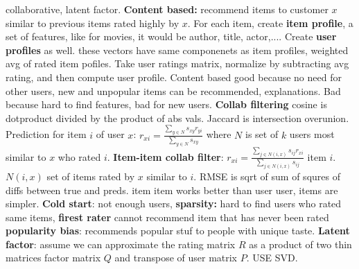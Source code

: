 \documentclass{amsbook}
\theoremstyle{plain}
\theoremstyle{definition}
\theoremstyle{remark}
\newcommand{\fracc}{\frac}
\begin{document}
collaborative, latent factor. \textbf{Content based: }recommend items to customer $x$ similar to previous items rated highly by $x$. For each item, create \textbf{item profile}, a set of features, like for movies, it would be author, title, actor,.... Create \textbf{user profiles} as well. these vectors have same componenets as item profiles, weighted avg of rated item pofiles. Take user ratings matrix, normalize by subtracting avg rating, and then compute user profile. Content based good because no need for other users, new and unpopular items can be recommended, explanations. Bad because hard to find features, bad for new users. \textbf{Collab filtering } cosine is dotproduct divided by the product of abs vals. Jaccard is intersection overunion. Prediction for item $i$ of user $x$: $r_{xi} = \fracc{\sum_{y \in N}s_{xy}r_{yi}}{\sum_{y \in N}s_{xy}}$ where $N$ is set of $k$ users most similar to $x$ who rated $i$. \textbf{Item-item collab filter}: $r_{xi} = \fracc{\sum_{j \in N(i,x)}s_{ij}r_{xi}}{\sum_{j \in N(i,x)}s_{ij}}$ item $i$. $N(i,x)$ set of items rated by $x$ similar to $i$. RMSE is sqrt of sum of squres of diffs between true and preds. item item works better than user user, items are simpler. \textbf{Cold start}: not enough users, \textbf{sparsity: }hard to find users who rated same items, \textbf{firest rater} cannot recommend item that has never been rated \textbf{popularity bias}: recommends popular stuf to people with unique taste. \textbf{Latent factor}: assume we can approximate the rating matrix $R$ as a product of two thin matrices factor matrix $Q$ and transpose of user matrix $P$. USE SVD. 







\large
\end{document}
